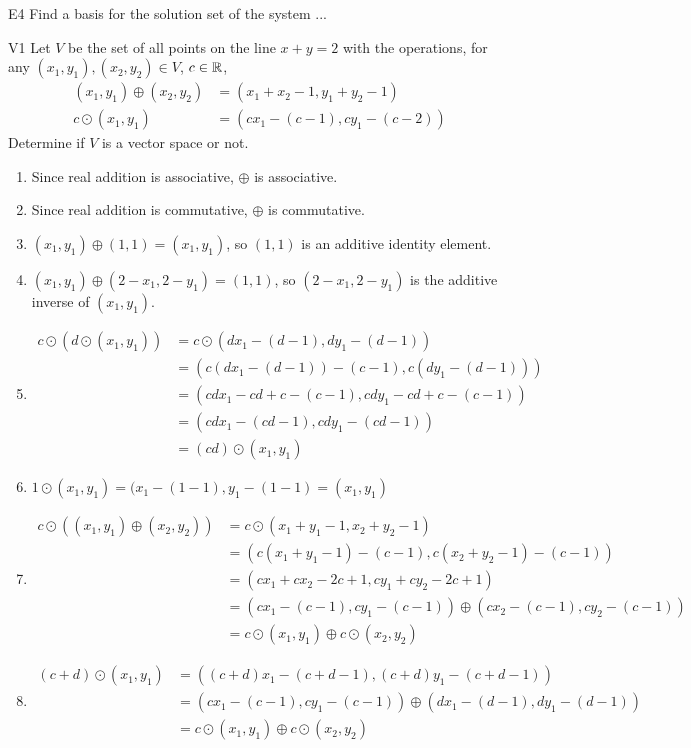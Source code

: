 \documentclass{sbgLAquiz}
\begin{document}
\begin{extract}\newpage\end{extract}
\begin{problem}{E4}
Find a basis for the solution set of the system ...
\end{problem}
\begin{problem}{V1}
Let $V$ be the set of all points on the line $x+y=2$ with the operations, for any $(x_1,y_1), (x_2,y_2) \in V$, $c \in \mathbb{R}$,
\begin{align*}
(x_1,y_1) \oplus (x_2,y_2) &= (x_1+x_2-1,y_1+y_2-1) \\
c \odot (x_1,y_1) &= (cx_1-(c-1), cy_1-(c-2))
\end{align*}
Determine if $V$ is a vector space or not.
\end{problem}
\begin{solution}
\begin{enumerate}[1)]
\item Since real addition is associative, $\oplus$ is associative.
\item Since real addition is commutative, $\oplus$ is commutative.
\item $(x_1,y_1) \oplus (1,1) = (x_1,y_1)$, so $(1,1)$ is an additive identity element.
\item $(x_1,y_1) \oplus (2-x_1,2-y_1) = (1,1)$, so $(2-x_1,2-y_1)$ is the additive inverse of $(x_1,y_1)$.
\item \begin{align*} c\odot \left(d \odot (x_1,y_1) \right) &=c\odot \left( dx_1-(d-1),dy_1-(d-1)\right) \\ 
&= \left( c\left(dx_1-(d-1) \right)-(c-1), c\left(dy_1-(d-1) \right) \right) \\
&= \left(cdx_1-cd+c-(c-1), cdy_1-cd+c-(c-1) \right) \\
&= \left(cdx_1-(cd-1), cdy_1-(cd-1) \right) \\
&= (cd) \odot (x_1,y_1)
\end{align*}
\item $1 \odot (x_1,y_1) = (x_1-(1-1),y_1-(1-1)=(x_1,y_1)$
\item \begin{align*} c \odot \left( (x_1,y_1)\oplus(x_2,y_2) \right) &= 
c\odot \left( x_1+y_1-1,x_2+y_2-1 \right) \\
&= \left( c(x_1+y_1-1)-(c-1), c(x_2+y_2-1)-(c-1) \right) \\
&= (cx_1+cx_2-2c+1, cy_1+cy_2-2c+1) \\
&= \left(cx_1-(c-1),cy_1-(c-1) \right) \oplus (cx_2-(c-1),cy_2-(c-1)) \\
&=c \odot (x_1,y_1) \oplus c\odot (x_2,y_2) 
\end{align*}
\item \begin{align*} (c+d) \odot (x_1,y_1) &=
\left( (c+d)x_1-(c+d-1), (c+d)y_1-(c+d-1) \right) \\
&= \left( cx_1-(c-1), cy_1-(c-1) \right) \oplus (dx_1-(d-1), dy_1-(d-1) ) \\
&= c\odot (x_1,y_1) \oplus c \odot (x_2,y_2)
\end{align*}
\end{enumerate}
\end{solution}
\end{document}
